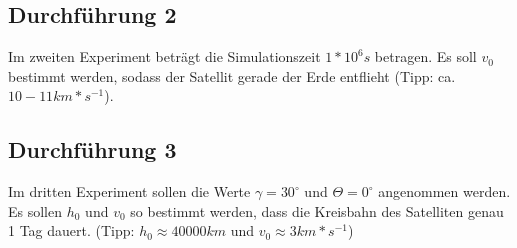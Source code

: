 \documentclass[]{scrartcl}
\begin{document}
\subsection{Durchführung 2}
Im zweiten Experiment beträgt die Simulationszeit $1 * 10^6s$ betragen. Es soll $v_{0}$ bestimmt werden, sodass der Satellit gerade der Erde entflieht (Tipp: ca. $10 - 11 km*s^{-1}$).

\subsection{Durchführung 3}
Im dritten Experiment sollen die Werte $\gamma = 30^\circ$ und $\Theta = 0^\circ$ angenommen werden. Es sollen $h_{0}$ und $v_{0}$ so bestimmt werden, dass die Kreisbahn des Satelliten genau 1 Tag dauert. (Tipp: $h_{0} \approx 40000 km$ und $v_{0} \approx 3 km *s ^{-1}$)
\end{document}
